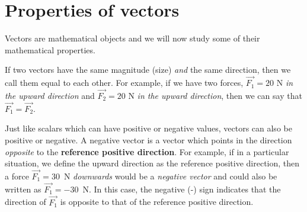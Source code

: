 \section{Properties of vectors}
    \nopagebreak
    \label{m38813*cid7}
      \label{m38813*id188277}

Vectors are mathematical objects and we will now study some of their mathematical properties. 

If two vectors have the same magnitude (size) \textit{and} the same direction, then we call them equal to each other. For example, if we have two forces,  $\stackrel{\to }{F_{1}} = 20$ N \textit{in the upward direction} and $\stackrel{\to }{F_{2}} = 20$ N \textit{in the upward direction}, then we can say that $\stackrel{\to }{F_{1}} = \stackrel{\to }{F_{2}}$.



Just like scalars which can have positive or negative values, vectors can also be positive or negative. 
A negative vector is a vector which points in the direction \textit{opposite} to the \textbf{reference positive direction}. 
For example, if in a particular situation, we define the upward direction as the reference positive direction, then a force $\stackrel{\to }{F_{1}} = 30$~N \textit{downwards} would be a \textit{negative vector} and could also be written as $\stackrel{\to }{F_{1}} = -30$~N. In this case, the negative (-) sign indicates that the direction of $\stackrel{\to }{F_{1}}$ is opposite to that of the reference positive direction.


